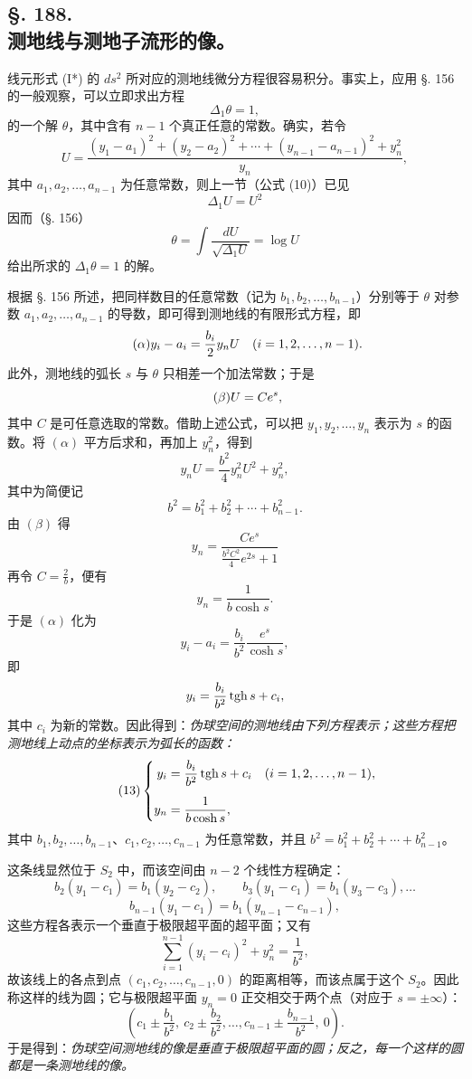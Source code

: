 \subsection*{§. 188.\\ 测地线与测地子流形的像。}

线元形式 (I*) 的 $ds^2$ 所对应的测地线微分方程很容易积分。事实上，应用 §. 156 的一般观察，可以立即求出方程
\[
 \Delta_1\theta=1,
\]
的一个解 $\theta$，其中含有 $n-1$ 个真正任意的常数。确实，若令
\[
 U=\frac{(y_1-a_1)^2+(y_2-a_2)^2+\cdots+(y_{n-1}-a_{n-1})^2+y_n^2}{y_n},
\]
其中 $a_1,a_2,\ldots,a_{n-1}$ 为任意常数，则上一节（公式 (10)）已见
\[
 \Delta_1U=U^2
\]
因而（§. 156）
\[
 \theta=\int\frac{dU}{\sqrt{\Delta_1U}}=\log U
\]
给出所求的 $\Delta_1\theta=1$ 的解。

根据 §. 156 所述，把同样数目的任意常数（记为 $b_1,b_2,\ldots,b_{n-1}$）分别等于 $\theta$ 对参数 $a_1,a_2,\ldots,a_{n-1}$ 的导数，即可得到测地线的有限形式方程，即
\[
\tag{\ensuremath{\alpha}}
 y_i-a_i=\frac{b_i}{2}y_nU\quad (i=1,2,\ldots,n-1).
\]
此外，测地线的弧长 $s$ 与 $\theta$ 只相差一个加法常数；于是
\[
\tag{\ensuremath{\beta}}
 U=Ce^s,
\]
其中 $C$ 是可任意选取的常数。借助上述公式，可以把 $y_1,y_2,\ldots,y_n$ 表示为 $s$ 的函数。将 $(\alpha)$ 平方后求和，再加上 $y_n^2$，得到
\[
 y_nU=\frac{b^2}{4}y_n^2U^2+y_n^2,
\]
其中为简便记
\[
 b^2=b_1^2+b_2^2+\cdots+b_{n-1}^2.
\]
由 $(\beta)$ 得
\[
 y_n=\frac{Ce^s}{\frac{b^2C^2}{4}e^{2s}+1}
\]
再令 $C=\frac2b$，便有
\[
 y_n=\frac1{b\cosh s}.
\]
于是 $(\alpha)$ 化为
\[
 y_i-a_i=\frac{b_i}{b^2}\frac{e^s}{\cosh s},
\]
即
\[
 y_i=\frac{b_i}{b^2}\operatorname{tgh} s+c_i,
\]
其中 $c_i$ 为新的常数。因此得到：\emph{伪球空间的测地线由下列方程表示；这些方程把测地线上动点的坐标表示为弧长的函数：}
\[
\tag{13}
\left\{
\begin{aligned}
 y_i&=\frac{b_i}{b^2}\operatorname{tgh} s+c_i\quad (i=1,2,\ldots,n-1),\\[.5em]
 y_n&=\frac1{b\cosh s},
\end{aligned}
\right.
\]
其中 $b_1,b_2,\ldots,b_{n-1}$、$c_1,c_2,\ldots,c_{n-1}$ 为任意常数，并且 $b^2=b_1^2+b_2^2+\cdots+b_{n-1}^2$。

这条线显然位于 $S_2$ 中，而该空间由 $n-2$ 个线性方程确定：
\[
 b_2(y_1-c_1)=b_1(y_2-c_2),
 \qquad
 b_3(y_1-c_1)=b_1(y_3-c_3),\ldots
\]
\[
 b_{n-1}(y_1-c_1)=b_1(y_{n-1}-c_{n-1}),
\]
这些方程各表示一个垂直于极限超平面的超平面；又有
\[
 \sum_{i=1}^{n-1}(y_i-c_i)^2+y_n^2=\frac1{b^2},
\]
故该线上的各点到点 $(c_1,c_2,\ldots,c_{n-1},0)$ 的距离相等，而该点属于这个 $S_2$。因此称这样的线为圆；它与极限超平面 $y_n=0$ 正交相交于两个点（对应于 $s=\pm\infty$）：
\[
 \left(c_1\pm\frac{b_1}{b^2},\ c_2\pm\frac{b_2}{b^2},\ldots,c_{n-1}\pm\frac{b_{n-1}}{b^2},\ 0\right).
\]
于是得到：\emph{伪球空间测地线的像是垂直于极限超平面的圆；反之，每一个这样的圆都是一条测地线的像。}

